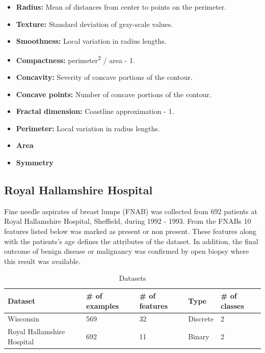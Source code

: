 \documentclass{kththesis}
\begin{document}
\begin{itemize} \itemsep0pt \parskip0pt 
	\item \textbf{Radius:} Mean of distances from center to points on the perimeter.
	\item \textbf{Texture:} Standard deviation of gray-scale values.
	\item \textbf{Smoothness:} Local variation in radius lengths.
  \item \textbf{Compactness:} perimeter\textsuperscript{2} / area - 1.
  \item \textbf{Concavity:} Severity of concave portions of the contour.
  \item \textbf{Concave points:} Number of concave portions of the contour.
  \item \textbf{Fractal dimension:} Coastline approximation - 1.
  \item \textbf{Perimeter:} Local variation in radius lengths.
  \item \textbf{Area}
  \item \textbf{Symmetry}
\end{itemize}

\subsection{Royal Hallamshire Hospital}

Fine needle aspirates of breast lumps (FNAB) was collected from 692 patients at Royal Hallamshire Hospital, Sheffield, during 1992 - 1993. From the FNABs 10 features listed below was marked as present or non present. These features along with the patients's age defines the attributes of the dataset. In addition, the final outcome of benign disease or malignancy was confirmed by open biopsy where this result was available.

\medskip
\begin{table}[ht!]
\begin{adjustwidth}{-.5in}{-.5in}
\begin{center}
  \begin{tabular}{l*{4}{l}}
  \hline
  Dataset         &
  \# of examples  &
  \# of features  &
  Type            &
  \# of classes   \\
  \hline
  Wisconsin                   &
  569                         &
  32                          &
  Discrete                    &
  2                           \\
  Royal Hallamshire Hospital  &
  692                         &
  11                          &
  Binary                      &
  2                           \\
  \hline
  \end{tabular}
  \caption{Datasets}
  \label{table:datasets_info}
\end{center}
\end{adjustwidth}
\end{table}
\end{document}
